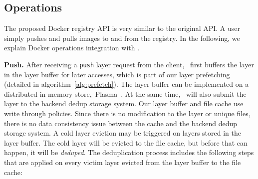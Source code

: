 \subsection{Operations}
\label{sec:design_operations}

%
The proposed Docker registry API is very similar to the original API.
A user simply pushes and pulls images to and from the registry. 
In the following, we explain Docker operations integration with \sysname.


\textbf{Push.}
After receiving a \texttt{push} layer request from the client, 
\sysname~first buffers the layer in the layer buffer for later accesses,
which is part of our layer prefetching (detailed in algorithm~\ref{alg:prefetch}). 
The layer buffer can be implemented on a distributed in-memory store,~\eg Plasma~\cite{plasma}.
At the same time, \sysname~will also submit the layer to the backend dedup storage system.
Our layer buffer and file cache use write through policies. 
Since there is no modification to the layer or unique files, 
there is no data consistency issue between the cache and the backend dedup storage system.
A cold layer eviction may be triggered on layers stored in the layer buffer.
The cold layer will be evicted to the file cache, but before that can happen, it will be \emph{deduped}.
The deduplication process includes the following steps 
that are applied on every victim layer evicted from the layer buffer to the file cache:

